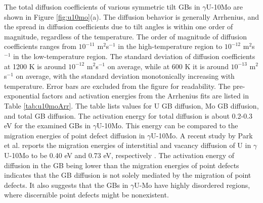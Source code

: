 \documentclass{elsarticle}
\begin{document}
The total diffusion coefficients of various symmetric tilt GBs in $\gamma$U-10Mo are shown in Figure \ref{fig:u10mo}(a). The diffusion behavior is generally Arrhenius, and the spread in diffusion coefficients due to tilt angles is within one order of magnitude, regardless of the temperature. The order of magnitude of diffusion coefficients ranges from $10^{-11}$ m$^2$s$^{-1}$ in the high-temperature region to $10^{-12}$ m$^2$s$^{-1}$ in the low-temperature region. The standard deviation of diffusion coefficients at 1200 K is around $10^{-12}$ m$^2$s$^{-1}$ on average, while at 600 K it is around $10^{-13}$ m$^2$s$^{-1}$ on average, with the standard deviation monotonically increasing with temperature. Error bars are excluded from the figure for readability. The pre-exponential factors and activation energies from the Arrhenius fits are listed in Table \ref{tab:u10moArr}. The table lists values for U GB diffusion, Mo GB diffusion, and total GB diffusion. The activation energy for total diffusion is about 0.2-0.3 eV for the examined GBs in $\gamma$U-10Mo. This energy can be compared to the migration energies of point defect diffusion in $\gamma$U-10Mo. A recent study by Park et al. reports the migration energies of interstitial and vacancy diffusion of U in $\gamma$U-10Mo to be 0.40 eV and 0.73 eV, respectively \cite{park2023}. The activation energy of diffusion in the GB being lower than the migration energies of point defects indicates that the GB diffusion is not solely mediated by the migration of point defects. It also suggests that the GBs in $\gamma$U-Mo have highly disordered regions, where discernible point defects might be nonexistent.
\end{document}
